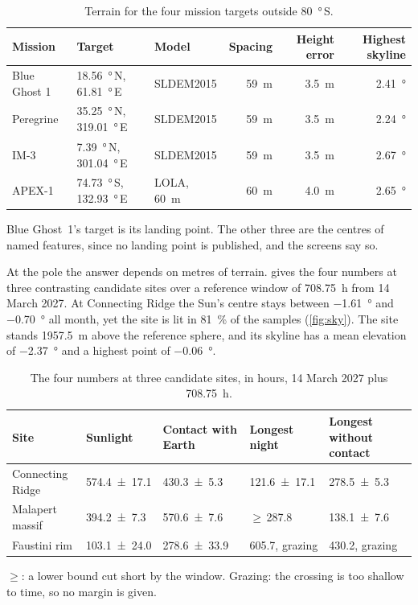 \documentclass[11pt,a4paper]{article}
\begin{document}
\begin{table}[htbp]
\centering\small
\caption{Terrain for the four mission targets outside \qty{80}{\degree}\,S.}
\label{tab:terrain}
\begin{tabular}{@{}lllrrr@{}}
\toprule
Mission & Target & Model & Spacing & Height error & Highest skyline \\
\midrule
Blue Ghost 1 & \qty{18.56}{\degree}\,N, \qty{61.81}{\degree}\,E & SLDEM2015 & \qty{59}{\m} & \qty{3.5}{\m} & \qty{2.41}{\degree} \\
Peregrine & \qty{35.25}{\degree}\,N, \qty{319.01}{\degree}\,E & SLDEM2015 & \qty{59}{\m} & \qty{3.5}{\m} & \qty{2.24}{\degree} \\
IM-3 & \qty{7.39}{\degree}\,N, \qty{301.04}{\degree}\,E & SLDEM2015 & \qty{59}{\m} & \qty{3.5}{\m} & \qty{2.67}{\degree} \\
APEX-1 & \qty{74.73}{\degree}\,S, \qty{132.93}{\degree}\,E & LOLA, \qty{60}{\m} & \qty{60}{\m} & \qty{4.0}{\m} & \qty{2.65}{\degree} \\
\bottomrule
\end{tabular}
\par\smallskip\footnotesize Blue Ghost~1's target is its landing point. The other three are the
centres of named features, since no landing point is published, and the screens say so.
\end{table}

At the pole the answer depends on metres of terrain.  gives the four
numbers at three contrasting candidate sites over a reference window of
\qty{708.75}{\hour} from 14 March 2027. At Connecting Ridge the Sun's centre stays between
\qty{-1.61}{\degree} and \qty{-0.70}{\degree} all month, yet the site is lit in
\qty{81}{\percent} of the samples (\cref{fig:sky}). The site stands \qty{1957.5}{\m} above
the reference sphere, and its skyline has a mean elevation of \qty{-2.37}{\degree} and a
highest point of \qty{-0.06}{\degree}.

\begin{table}[htbp]
\centering\small
\caption{The four numbers at three candidate sites, in hours, 14 March 2027 plus
\qty{708.75}{\hour}.}
\label{tab:sites}
\begin{tabular}{@{}lllll@{}}
\toprule
Site & Sunlight & Contact with Earth & Longest night & Longest without contact \\
\midrule
Connecting Ridge & \num{574.4 +- 17.1} & \num{430.3 +- 5.3} & \num{121.6 +- 17.1} & \num{278.5 +- 5.3} \\
Malapert massif & \num{394.2 +- 7.3} & \num{570.6 +- 7.6} & $\geq$\,\num{287.8} & \num{138.1 +- 7.6} \\
Faustini rim & \num{103.1 +- 24.0} & \num{278.6 +- 33.9} & \num{605.7}, grazing & \num{430.2}, grazing \\
\bottomrule
\end{tabular}
\par\smallskip\footnotesize $\geq$: a lower bound cut short by the window. Grazing: the
crossing is too shallow to time, so no margin is given.
\end{table}
\end{document}

